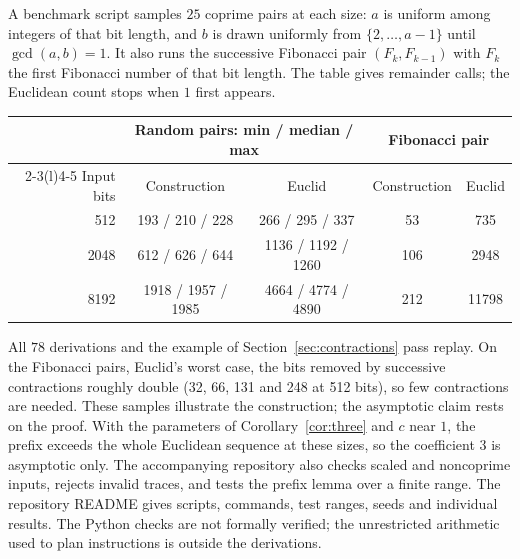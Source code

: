 \documentclass[11pt]{article}
\theoremstyle{remark}
\begin{document}
A benchmark script samples $25$ coprime pairs at each size: $a$ is uniform among
integers of that bit length, and $b$ is drawn uniformly from
$\{2,\ldots,a-1\}$ until $\gcd(a,b)=1$. It also runs the successive
Fibonacci pair $(F_k,F_{k-1})$ with $F_k$ the first Fibonacci number of
that bit length. The table gives remainder calls;
the Euclidean count stops when $1$ first appears.
\begin{center}
\small
\begin{tabular}{rcccc}\toprule
 & \multicolumn{2}{c}{Random pairs: min / median / max}
 & \multicolumn{2}{c}{Fibonacci pair}\\
\cmidrule(lr){2-3}\cmidrule(l){4-5}
Input bits & Construction & Euclid & Construction & Euclid\\\midrule
512 & 193 / 210 / 228 & 266 / 295 / 337 & 53 & 735\\
2048 & 612 / 626 / 644 & 1136 / 1192 / 1260 & 106 & 2948\\
8192 & 1918 / 1957 / 1985 & 4664 / 4774 / 4890 & 212 & 11798\\\bottomrule
\end{tabular}
\end{center}
All $78$ derivations and the example of Section~\ref{sec:contractions} pass
replay. On the Fibonacci pairs, Euclid's worst case, the bits
removed by successive contractions roughly double (32, 66, 131 and 248
at 512 bits), so few contractions are needed. These samples illustrate the construction; the
asymptotic claim rests on the proof. With the parameters of
Corollary~\ref{cor:three} and $c$ near $1$, the prefix exceeds the whole Euclidean sequence at these sizes, so the
coefficient $3$ is asymptotic only. The
accompanying repository also checks scaled and noncoprime inputs, rejects invalid traces, and tests the prefix
lemma over a finite range. The repository README gives scripts, commands,
test ranges, seeds and individual results. The Python checks are not formally verified;
the unrestricted arithmetic used to plan instructions is outside the
derivations.

\appendix
\end{document}
